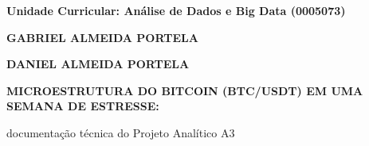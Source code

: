 \documentclass[
  12pt,
  openany,
  oneside,
  a4paper,
  chapter=TITLE,
  section=TITLE,
  english,
  brazil,
  sumario=tradicional
]{abntex2}
\renewcommand{\ABNTEXchapterfont}{\rmfamily\bfseries}
\begin{document}
\frenchspacing

\pretextual

\renewcommand{\imprimircapa}{%
  \begin{capa}%
    \center
    {\ABNTEXchapterfont\MakeUppercase{\imprimirinstituicao}}\par
    {\ABNTEXchapterfont Unidade Curricular: Análise de Dados e Big Data (0005073)}
    \vspace*{2.5cm}

    {\ABNTEXchapterfont\MakeUppercase{Gabriel Almeida Portela}}\par
    {\ABNTEXchapterfont\MakeUppercase{Daniel Almeida Portela}}
    \vfill

    \begin{center}
      \ABNTEXchapterfont\bfseries
      MICROESTRUTURA DO BITCOIN (BTC/USDT) EM UMA SEMANA DE ESTRESSE:\par
      \mdseries documentação técnica do Projeto Analítico A3
    \end{center}
    \vfill

    \MakeUppercase{\imprimirlocal}\par
    \imprimirdata
    \vspace*{1cm}
  \end{capa}
}
\imprimircapa
\end{document}
